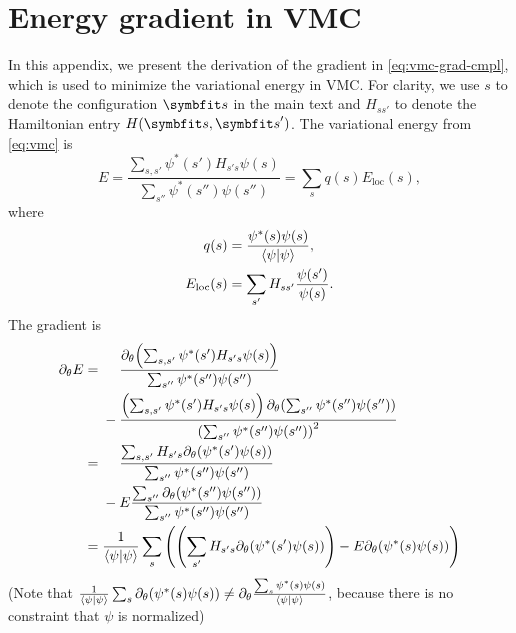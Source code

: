 \appendix


\newcommand{\dta}{{\Delta \tau}}
\newcommand{\dth}{{\Delta \theta}}
\newcommand{\evbig}[1]{\big\langle #1 \big\rangle}
\newcommand{\fpsps}[1]{\frac{#1}{\ip{\psi}}}
\newcommand{\pp}{\partial}

\chapter{Energy gradient in VMC}
\label{append:vmc-grad}

In this appendix, we present the derivation of the gradient in \cref{eq:vmc-grad-cmpl}, which is used to minimize the variational energy in VMC. For clarity, we use $s$ to denote the configuration $\vs$ in the main text and $H_{s s'}$ to denote the Hamiltonian entry $H(\vs, \vs')$. The variational energy from \cref{eq:vmc} is
\begin{equation}
E = \frac{\sum_{s, s'} \psi^*(s') H_{s' s} \psi(s)}{\sum_{s''} \psi^*(s'') \psi(s'')}
= \sum_s q(s) E_\text{loc}(s),
\end{equation}
where
\begin{align}
q(s) &= \frac{\psi^*(s) \psi(s)}{\ip{\psi}}, \\
E_\text{loc}(s) &= \sum_{s'} H_{s s'} \frac{\psi(s')}{\psi(s)}.
\end{align}
The gradient is
\begin{align}
\pp_\theta E &= \phantom{{}-{}}\frac{\pp_\theta\!\left( \sum_{s, s'} \psi^*(s') H_{s' s} \psi(s) \right)}{\sum_{s''} \psi^*(s'') \psi(s'')} \nonumber \\
&\phantom{{}={}}- \frac{\left( \sum_{s, s'} \psi^*(s') H_{s' s} \psi(s) \right) \pp_\theta\!\left( \sum_{s''} \psi^*(s'') \psi(s'') \right)}{\left( \sum_{s''} \psi^*(s'') \psi(s'') \right)^2} \\
&= \phantom{{}-{}}\frac{\sum_{s, s'} H_{s' s} \pp_\theta\!\left( \psi^*(s') \psi(s) \right)}{\sum_{s''} \psi^*(s'') \psi(s'')} \nonumber \\
&\phantom{{}={}}- E \frac{\sum_{s''} \pp_\theta\!\left( \psi^*(s'') \psi(s'') \right)}{\sum_{s''} \psi^*(s'') \psi(s'')} \\
&= \frac{1}{\ip{\psi}} \sum_s \left( \left( \sum_{s'} H_{s' s} \pp_\theta\!\left( \psi^*(s') \psi(s) \right) \right) - E \pp_\theta\!\left( \psi^*(s) \psi(s) \right) \right)
\end{align}
(Note that $\frac{1}{\ip{\psi}} \sum_s \pp_\theta\!\left( \psi^*(s) \psi(s) \right) \neq \pp_\theta \frac{\sum_s \psi^*(s) \psi(s)}{\ip{\psi}}$, because there is no constraint that $\psi$ is normalized)


